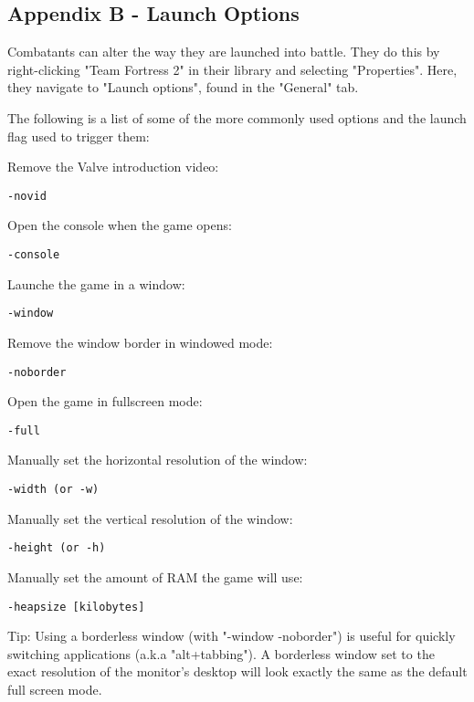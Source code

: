 \subsection{Appendix B - Launch Options}
Combatants can alter the way they are launched into battle. They do this by right-clicking "Team Fortress 2" in their library and selecting "Properties". Here, they navigate to "Launch options", found in the "General" tab.

The following is a list of some of the more commonly used options and the launch flag used to trigger them:

Remove the Valve introduction video:
\begin{lstlisting}
-novid
\end{lstlisting}
Open the console when the game opens:
\begin{lstlisting}
-console
\end{lstlisting}
Launche the game in a window:
\begin{lstlisting}
-window
\end{lstlisting}
Remove the window border in windowed mode:
\begin{lstlisting}
-noborder
\end{lstlisting}
Open the game in fullscreen mode:
\begin{lstlisting}
-full
\end{lstlisting}
Manually set the horizontal resolution of the window:
\begin{lstlisting}
-width (or -w)
\end{lstlisting}
Manually set the vertical resolution of the window:
\begin{lstlisting}
-height (or -h)
\end{lstlisting}
Manually set the amount of RAM the game will use:
\begin{lstlisting}
-heapsize [kilobytes]
\end{lstlisting}

Tip: Using a borderless window (with "-window -noborder") is useful for quickly switching applications (a.k.a "alt+tabbing").  A borderless window set to the exact resolution of the monitor's desktop will look exactly the same as the default full screen mode.